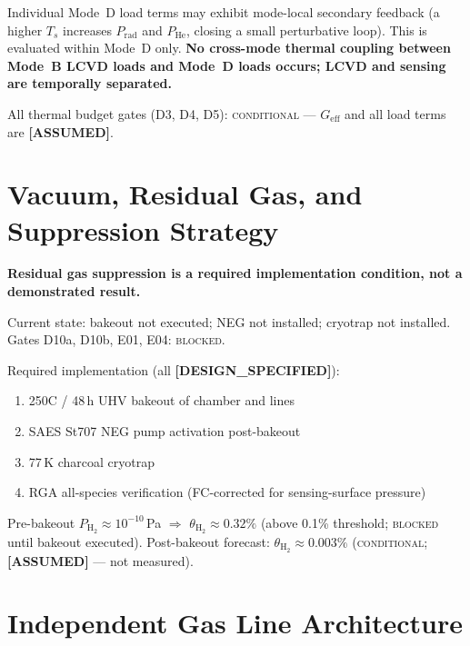 \documentclass[12pt,a4paper]{article}
\newcommand{\blocked}{\textsc{blocked}}
\newcommand{\conditional}{\textsc{conditional}}
\newcommand{\assumed}{\textbf{[ASSUMED]}}
\newcommand{\designspec}{\textbf{[DESIGN\_SPECIFIED]}}
\begin{document}
Individual Mode~D load terms may exhibit mode-local secondary feedback
(a higher $T_s$ increases $P_\mathrm{rad}$ and $P_\mathrm{He}$, closing a small perturbative loop).
This is evaluated within Mode~D only.
\textbf{No cross-mode thermal coupling between Mode~B LCVD loads and Mode~D loads occurs;
LCVD and sensing are temporally separated.}

All thermal budget gates (\textsc{D3}, \textsc{D4}, \textsc{D5}): \conditional{}
--- $G_\mathrm{eff}$ and all load terms are \assumed{}.

\section{Vacuum, Residual Gas, and Suppression Strategy}
\label{sec:vacuum}

\textbf{Residual gas suppression is a required implementation condition, not a demonstrated result.}

Current state: bakeout not executed; NEG not installed; cryotrap not installed.
Gates D10a, D10b, E01, E04: \blocked{}.

Required implementation (all \designspec{}):
\begin{enumerate}[noitemsep]
  \item 250\textdegree{}C / 48\,h UHV bakeout of chamber and lines~\cite{O_Hanlon2003,Jousten2016}
  \item SAES St707 NEG pump activation post-bakeout~\cite{DalPalmiero2004}
  \item 77\,K charcoal cryotrap~\cite{CERN2020}
  \item RGA all-species verification (FC-corrected for sensing-surface pressure)~\cite{Giorgi2010}
\end{enumerate}

Pre-bakeout $P_\mathrm{H_2} \approx 10^{-10}$\,Pa $\Rightarrow$
$\theta_\mathrm{H_2} \approx 0.32\%$ (above 0.1\% threshold;
\blocked{} until bakeout executed).
Post-bakeout forecast: $\theta_\mathrm{H_2} \approx 0.003\%$ (\conditional{};
\assumed{} --- not measured).

\section{Independent Gas Line Architecture}
\label{sec:gaslines}
\end{document}
